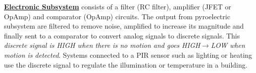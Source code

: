 
\noindent \underline{\bfseries Electronic Subsystem} consists of a filter (RC filter), amplifier (JFET or OpAmp) and comparator (OpAmp) circuits. The output from pyroelectric subsystem are filtered to remove noise, amplified to increase its magnitude and finally sent to a comparator to convert analog signals to discrete signals. This \textit{discrete signal is HIGH when there is no motion and goes HIGH$\rightarrow$LOW when motion is detected}. Systems connected to a PIR sensor such as lighting or heating use the discrete signal to regulate the illumination or temperature in a building.




